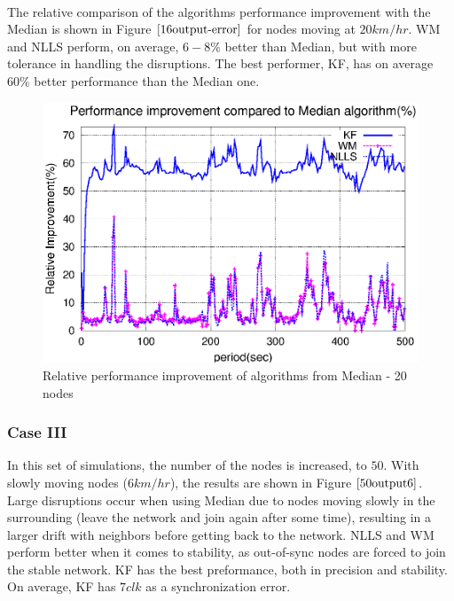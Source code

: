 \documentclass[a4paper,10pt]{report}
\begin{document}
\paragraph*{}
The relative comparison of the algorithms performance improvement with the Median is shown in Figure $\ref{16output-error}$ for nodes moving at $20km/hr$. WM and NLLS perform, on average, $6-8\%$ better than Median, but with more tolerance in handling the disruptions. The best performer, KF, has on average $60\%$ better performance than the Median one.
\begin{figure}
\centering
\includegraphics[width= 0.7 \textwidth]{16output-error}
\caption{Relative performance improvement of algorithms from Median - 20 nodes} \label{16output-error}
\end{figure}
\subsubsection{\textbf{Case III}}
In this set of simulations, the number of the nodes is increased, to $50$. With slowly moving nodes ($6km/hr$), the results are shown in Figure $\ref{50output6}$. Large disruptions occur when using Median due to nodes moving slowly in the surrounding (leave the network and join again after some time), resulting in a larger drift with neighbors before getting back to the network. NLLS and WM perform better when it comes to stability, as out-of-sync nodes are forced to join the stable network. KF has the best preformance, both in precision and stability. On average, KF has $7clk$ as a synchronization error.
\end{document}
